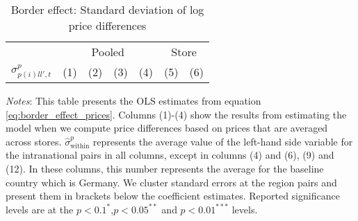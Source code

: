 \begin{table}
    \centering
    \caption{Border effect: Standard deviation of log price differences}
    \label{tab: border_effects_sd}
    \begin{spacing}{1.1}
        \begin{tabular}{lcccccc} \toprule
            & \multicolumn{4}{c}{Pooled} & \multicolumn{2}{c}{Store} \\ 
            \cmidrule(lr){2-5} \cmidrule(lr){6-7}
            $\sigma^{p}_{p(i)ll',t}$ & (1) & (2) & (3) & (4) & (5) & (6) \\ \midrule
            
        \end{tabular}
    \end{spacing}
    \parbox{\textwidth}{
    \begin{spacing}{1} 
        {\footnotesize 
        \textit{Notes}: This table presents the OLS estimates from equation \ref{eq:border_effect_prices}. Columns (1)-(4) show the results from estimating the model when we compute price differences based on prices that are averaged across stores. $\hat{\sigma}^p_{\text{within}}$ represents the average value of the left-hand side variable for the intranational pairs in all columns, except in columns (4) and (6), (9) and (12). In these columns, this number represents the average for the baseline country which is Germany. We cluster standard errors at the region pairs and present them in brackets below the coefficient estimates. Reported significance levels are at the $p<0.1^{*}$,$p<0.05^{**}$ and $p<0.01^{***}$ levels.} 
    \end{spacing}}
 \end{table}

